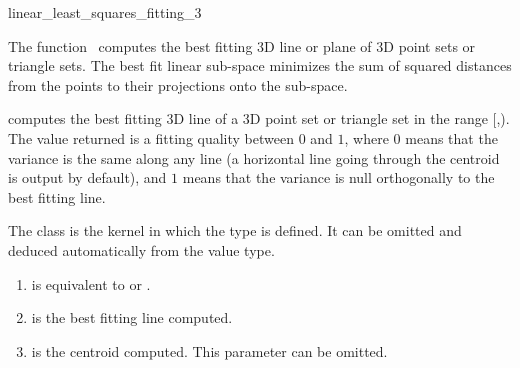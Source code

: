 
\begin{ccRefFunction}{linear_least_squares_fitting_3}  


\ccDefinition
  
The function \ccRefName\ computes the best fitting 3D line or plane of 3D
point sets or triangle sets. The best fit linear sub-space minimizes
the sum of squared distances from the points to their projections onto the
sub-space.


{ computes the best fitting 3D line of a 3D point set or triangle set in the range
[,). The value returned is a fitting quality
between $0$ and $1$, where $0$ means that the variance is the same
along any line (a horizontal line going through the centroid is output
by default), and $1$ means that the variance is null orthogonally
to the best fitting line. }

The class  is the kernel in which the type
 is defined. It can be omitted and
deduced automatically from the value type.


\begin{enumerate}
   \item  {} is equivalent to  or .
   \item  {} is the best fitting line computed.
   \item  {} is the centroid computed. This parameter can be
          omitted.
\end{enumerate}



\end{ccRefFunction}
